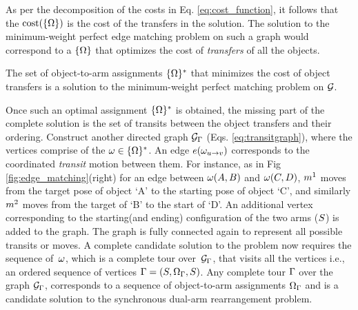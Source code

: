 As per the decomposition of the costs in Eq. \ref{eq:cost_function}, it follows that the $ \textup{cost}(\{{{\Omega}}\}) $ is the cost of the transfers in the solution. The solution to the minimum-weight perfect edge matching problem on such a graph would correspond to a $ \{{{\Omega}}\} $ that optimizes the cost of \textit{transfers} of all the objects.

\vspace{-0.13in}
{
The set of object-to-arm assignments $ \{{{\Omega}}\}^* $ that minimizes the cost of object transfers is a solution to the minimum-weight perfect matching problem on $ \mathcal{G} $.
}

Once such an optimal assignment $ \{{{\Omega}}\}^* $ is obtained, the missing part of the complete solution is the set of transits between the object transfers and their ordering. Construct another directed graph $ \mathcal{G}_{{\Gamma}} $ (Eqs. \ref{eq:transitgraph}), where the vertices comprise of the $ {\omega} \in \{{{\Omega}}\}^*$. An edge $ e({\omega}_{u\rightarrow v}) $ corresponds to the coordinated \textit{transit} motion between them. For instance, as in Fig \ref{fig:edge_matching}(right) for an edge between $ {\omega}(A,B) $ and $ {\omega}(C,D) $, $ m^1 $ moves from the target pose of object `A' to the starting pose of object `C', and similarly $ m^2 $ moves from the target of `B' to the start of `D'. An additional vertex corresponding to the starting(and ending) configuration of the two arms ($ S $) is added to the graph. The graph is fully connected again to represent all possible transits or moves.  
A complete candidate solution to the problem now requires the sequence of~$ {\omega} $, 
which is a complete tour over~$ \mathcal{G}_{{\Gamma}} $, that visits all the vertices i.e., an ordered sequence of vertices ${\Gamma} = ( {S}, {{\Omega}}_{\Gamma}, {S}  )$.
\vspace{-0.1in}
{
\lemma [Tour]
Any complete tour $ {\Gamma} $ over the graph $ \mathcal{G}_{{\Gamma}} $, corresponds to a sequence of object-to-arm assignments $ {{\Omega}}_{\Gamma} $ and is a candidate solution to the synchronous dual-arm rearrangement problem.
}



